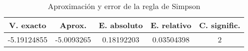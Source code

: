 \begin{table}[h]
  \begin{center}
    \begin{tabular}{|c|c|c|c|c|} \hline 
      \textbf{V. exacto} & \textbf{Aprox.} & \textbf{E. absoluto} & 
      \textbf{E. relativo} & \textbf{C. signific.}\\ 
      \hline
      -5.19124855 & -5.0093265 & 0.18192203 & 0.03504398 & 2
      \\
      \hline
    \end{tabular}
  \end{center}
  \caption{Aproximaci\'on y error de la regla de Simpson}
  \label{tab:3}
\end{table}

